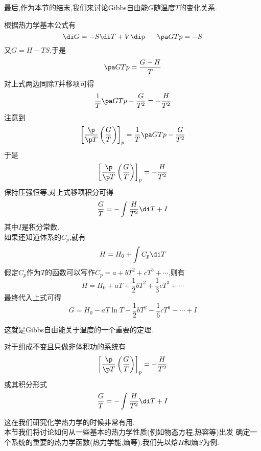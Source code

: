 \documentclass{ctexart}
\begin{document}
最后,作为本节的结末,我们来讨论Gibbs自由能$G$随温度$T$的变化关系.
\begin{derivation}
    根据热力学基本公式有
    \[\di G=-S\di T+V\di p\ \ \ \ \ \pa GTp=-S\]
    又$G=H-TS$,于是
    \[\pa GTp=\dfrac{G-H}{T}\]
    对上式两边同除$T$并移项可得
    \[\dfrac1T\pa GTp-\dfrac{G}{T^2}=-\dfrac{H}{T^2}\]
    注意到
    \[\left[\dfrac{\p}{\p T}\left(\dfrac{G}{T}\right)\right]_p=\dfrac1T\pa GTp-\dfrac{G}{T^2}\]
    于是
    \[\left[\dfrac{\p}{\p T}\left(\dfrac{G}{T}\right)\right]_p=-\dfrac{H}{T^2}\]
    保持压强恒等,对上式移项积分可得
    \[\dfrac{G}{T}=-\int\dfrac{H}{T^2}\di T+I\]
    其中$I$是积分常数.\\
    如果还知道体系的$C_p$,就有
    \[H=H_0+\int C_p\di T\]
    假定$C_p$作为$T$的函数可以写作$C_p=a+bT^2+cT^3+\cdots$,则有
    \[H=H_0+aT+\dfrac12bT^2+\dfrac13cT^3+\cdots\]
    最终代入上式可得
    \[G=H_0-aT\ln T-\dfrac12bT^2-\dfrac16cT^3-\cdots+I\]

\end{derivation}
这就是Gibbs自由能关于温度的一个重要的定理.
\begin{theorem}
    对于组成不变且只做非体积功的系统有
    \[\left[\dfrac{\p}{\p T}\left(\dfrac{G}{T}\right)\right]_p=-\dfrac{H}{T^2}\]
    或其积分形式
    \[\dfrac{G}{T}=-\int\dfrac{H}{T^2}\di T+I\]

\end{theorem}
这在我们研究化学热力学的时候非常有用.\vspace{12pt}\\
\indent 本节我们将讨论如何从一些基本的热力学性质(例如物态方程,热容等)出发%
确定一个系统的重要的热力学函数(热力学能,熵等).我们先以焓$H$和熵$S$为例.
\end{document}

